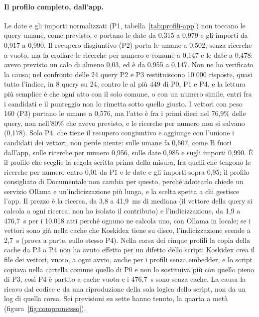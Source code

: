 \paragraph{Il profilo completo, dall'app.} Le date e gli importi normalizzati
(P1, tabella~\ref{tab:profili-app}) non toccano le query umane, come previsto, e portano le date da 0,315 a
0,979 e gli importi da 0,917 a 0,990. Il recupero disgiuntivo (P2) porta le
umane a 0,502, senza ricerche a vuoto, ma fa crollare le ricerche per numero e
comune a 0,147 e le date a 0,478: avevo previsto un calo di almeno 0,03, ed è
da 0,955 a 0,147. Non ne ho verificato la causa; nel confronto delle 24 query P2 e P3
restituiscono 10.000 risposte, quasi tutto l'indice, in 8 query su 24, contro le al più 449
di P0, P1 e P4, e la lettura più semplice è che ogni atto con il solo comune, o
con un numero simile, entri fra i candidati e il punteggio non lo rimetta sotto
quello giusto. I vettori con peso 160 (P3) portano le umane a 0,576, ma
l'atto è fra i primi dieci nel 76,9\% delle query, non nell'80\% che avevo
previsto, e le ricerche per numero non si salvano (0,178). Solo P4, che tiene il
recupero congiuntivo e aggiunge con l'unione i candidati dei vettori, non perde
niente: sulle umane fa 0,607, come B fuori dall'app, sulle ricerche per numero
0,956, sulle date 0,985 e sugli importi 0,990. È il profilo che sceglie la
regola scritta prima della misura, fra quelli che tengono le ricerche per
numero entro 0,01 da P1 e le date e gli importi sopra 0,95; il profilo consigliato di Documentale non cambia
per questo, perché adottarlo chiede un servizio Ollama e un'indicizzazione
più lunga, e la scelta spetta a chi gestisce l'app. Il prezzo è la ricerca, da 3,8 a 41,9~ms di mediana
(il vettore della query si calcola a ogni ricerca; non ho isolato il contributo)
e l'indicizzazione, da 1,9 a 476,7~s
per i 10.018 atti perché ognuno ne calcola uno, con Ollama in locale; se i
vettori sono già nella cache che Koskidex tiene su disco, l'indicizzazione scende
a 2,7~s (prova a parte, sullo stesso P4). Nella corsa dei cinque profili la
copia della cache da P3 a P4 non ha avuto effetto per un difetto dello script:
Koskidex crea il file dei vettori, vuoto, a ogni avvio, anche per i profili
senza embedder, e lo script copiava nella cartella comune quello di P0 e non lo
sostituiva più con quello pieno di P3, così P4 è partito a cache vuota e i
476,7~s sono senza cache. La causa la ricavo dal codice e da una riproduzione
della sola logica dello script, non da un log di quella corsa. Sei previsioni su sette hanno
tenuto, la quarta a metà (figura~\ref{fig:compromesso}).


